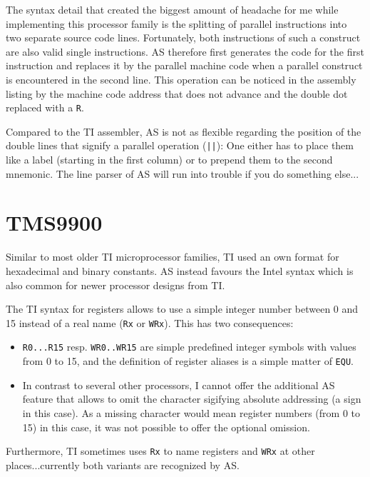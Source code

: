 \documentclass[12pt,twoside]{report}
\newcommand{\tty}[1]{{\tt #1}}
\begin{document}
The syntax detail that created the biggest amount of headache for me
while implementing this processor family is the splitting of parallel
instructions into two separate source code lines.  Fortunately, both
instructions of such a construct are also valid single instructions.
AS therefore first generates the code for the first instruction and
replaces it by the parallel machine code when a parallel construct is
encountered in the second line.  This operation can be noticed in the
assembly listing by the machine code address that does not advance
and the double dot replaced with a \tty{R}.

Compared to the TI assembler, AS is not as flexible regarding the
position of the double lines that signify a parallel operation
(\tty{||}): One either has to place them like a label (starting in the
first column) or to prepend them to the second mnemonic.  The line
parser of AS will run into trouble if you do something else...


\section{TMS9900}

Similar to most older TI microprocessor families, TI used an own
format for hexadecimal and binary constants.  AS instead favours the
Intel syntax which is also common for newer processor designs from
TI.

The TI syntax for registers allows to use a simple integer number
between 0 and 15 instead of a real name (\tty{Rx} or \tty{WRx}).
This has two consequences:
\begin{itemize}
\item{\tty{R0...R15} resp. \tty{WR0..WR15} are simple predefined integer
      symbols with values from 0 to 15, and the definition of register
      aliases is a simple matter of \tty{EQU}.}
\item{In contrast to several other processors, I cannot offer the
      additional AS feature that allows to omit the character sigifying
      absolute addressing (a \@ sign in this case).  As a missing
      character would mean register numbers (from 0 to 15) in this case,
      it was not possible to offer the optional omission.}
\end{itemize}
Furthermore, TI sometimes uses \tty{Rx} to name registers and \tty{WRx}
at other places...currently both variants are recognized by AS.
\end{document}
